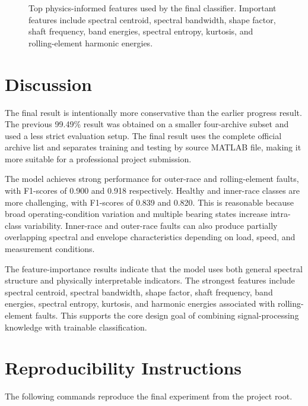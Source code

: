 \documentclass[11pt,a4paper]{article}
\begin{document}
\begin{figure}[H]
\centering

\caption{Top physics-informed features used by the final classifier. Important features include spectral centroid, spectral bandwidth, shape factor, shaft frequency, band energies, spectral entropy, kurtosis, and rolling-element harmonic energies.}
\label{fig:importance}
\end{figure}

\section{Discussion}
The final result is intentionally more conservative than the earlier progress result. The previous 99.49\% result was obtained on a smaller four-archive subset and used a less strict evaluation setup. The final result uses the complete official archive list and separates training and testing by source MATLAB file, making it more suitable for a professional project submission.

The model achieves strong performance for outer-race and rolling-element faults, with F1-scores of 0.900 and 0.918 respectively. Healthy and inner-race classes are more challenging, with F1-scores of 0.839 and 0.820. This is reasonable because broad operating-condition variation and multiple bearing states increase intra-class variability. Inner-race and outer-race faults can also produce partially overlapping spectral and envelope characteristics depending on load, speed, and measurement conditions.

The feature-importance results indicate that the model uses both general spectral structure and physically interpretable indicators. The strongest features include spectral centroid, spectral bandwidth, shape factor, shaft frequency, band energies, spectral entropy, kurtosis, and harmonic energies associated with rolling-element faults. This supports the core design goal of combining signal-processing knowledge with trainable classification.

\section{Reproducibility Instructions}
The following commands reproduce the final experiment from the project root.
\end{document}

